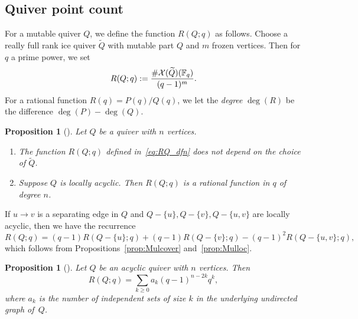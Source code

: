 \documentclass[11pt]{article}
\newtheorem{proposition}[theo]{Proposition}
\theoremstyle{definition}
\numberwithin{equation}{section}
\newcommand\Qice{\widetilde{Q}}
\def\RQ(#1){R(Q;#1)}
\def\RQX#1#2{R(#1;#2)}
\newcommand\F{\mathbb{F}}
\newcommand\XQice{\Xcal(\Qice)}
\newcommand\Louise{locally acyclic\xspace}
\begin{document}
\subsection{Quiver point count}
For a mutable quiver $Q$, we define the function $\RQ(q)$ as follows. Choose a really full rank ice quiver $\Qice$ with mutable part $Q$ and $m$ frozen vertices. Then for $q$ a prime power, we set
\begin{equation}\label{eq:RQ_dfn}
  \RQ(q):=\frac{\#\XQice(\F_q)}{(q-1)^m}.
\end{equation}
For a rational function $R(q)=P(q)/Q(q)$, we let the \emph{degree} $\deg(R)$ be the difference $\deg(P)-\deg(Q)$. 
\begin{proposition}[{\cite[Proposition 5.11 and Theorem 10.5]{LS}}]\label{prop:Q_pcnt}
  Let $Q$ be a quiver with $n$ vertices.
  \begin{enumerate}
  \item The function $\RQ(q)$ defined in~\eqref{eq:RQ_dfn} does not depend on the choice of $\Qice$.
  \item Suppose $Q$ is \Louise. Then $\RQ(q)$ is a rational function in $q$ of degree $n$. %
  \end{enumerate}
\end{proposition}
If $u \to v$ is a separating edge in $Q$ and $Q-\{u\},Q-\{v\},Q-\{u,v\}$ are \Louise, then we have the recurrence
\begin{equation}\label{eq:RQ_recurrence}
  \RQ(q) = (q-1)\RQX{Q-\{u\}}{q}+ (q-1)\RQX{Q-\{v\}}{q}- (q-1)^2\RQX{Q-\{u,v\}}{q},
\end{equation}
which follows from Propositions~\ref{prop:Mulcover} and~\ref{prop:Mulloc}.

\begin{proposition}[{\cite[Proposition 3.9]{LS2}}] \label{prop:acycliccount}
Let $Q$ be an acyclic quiver with $n$ vertices.  Then 
$$
\RQ(q) = \sum_{k \geq 0} a_k (q-1)^{n-2k} q^k,
$$
where $a_k$ is the number of independent sets of size $k$ in the underlying undirected graph of~$Q$.
\end{proposition}
\end{document}
